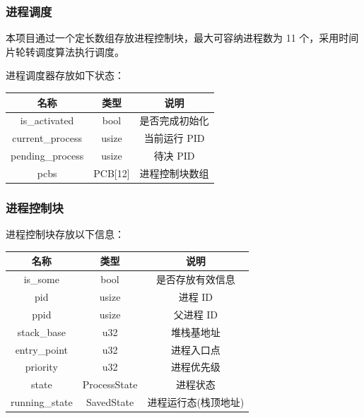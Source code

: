 \documentclass[aspectratio=169]{beamer}
\begin{document}
\begin{frame}

    \frametitle{进程调度}

    本项目通过一个定长数组存放进程控制块，最大可容纳进程数为 11 个，采用时间片轮转调度算法执行调度。

    \par

    进程调度器存放如下状态：

    \begin{center}
        \begin{tabular}{ |c|c|c| }
            \hline
            \textbf{名称} & \textbf{类型} & \textbf{说明} \\ \hline
            is\_activated & bool & 是否完成初始化 \\ 
            current\_process & usize & 当前运行 PID \\ 
            pending\_process & usize & 待决 PID \\ 
            pcbs & PCB[12] & 进程控制块数组 \\ \hline
        \end{tabular}
    \end{center}
    
\end{frame}

\begin{frame}
    \frametitle{进程控制块}

    进程控制块存放以下信息：

    \begin{center}
        \begin{tabular}{ |c|c|c| }
            \hline
            \textbf{名称} & \textbf{类型} & \textbf{说明} \\ \hline
            is\_some & bool & 是否存放有效信息 \\ 
            pid & usize & 进程 ID \\ 
            ppid & usize & 父进程 ID \\
            stack\_base & u32 & 堆栈基地址 \\
            entry\_point & u32 & 进程入口点 \\
            priority & u32 & 进程优先级 \\
            state & ProcessState & 进程状态 \\ 
            running\_state & SavedState & 进程运行态(栈顶地址) \\ \hline
        \end{tabular}
    \end{center}
\end{frame}
\end{document}
